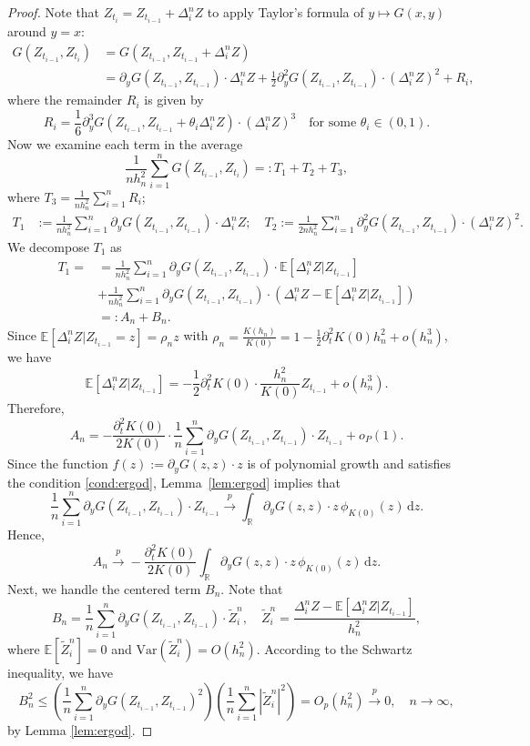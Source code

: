\documentclass[a4paper,10pt,twoside]{article}
\numberwithin{equation}{section}
\def\l{\left}
\def\r{\right}
\def\p{\partial}
\def\toP{\stackrel{p}{\longrightarrow}}
\def\E{\mathbb{E}}
\def\wt#1{\widetilde{#1}}
\def\Var{\mathrm{Var}}
\def\df{\mathrm{d}}
\begin{document}
\begin{proof}
Note that  $Z_{t_i} = Z_{t_{i-1}} + \Delta_i^n Z$
to apply Taylor's formula of $y \mapsto G(x,y)$ around $y = x$: 
\begin{align*}
G(Z_{t_{i-1}}, Z_{t_i}) 
&= G(Z_{t_{i-1}}, Z_{t_{i-1}} + \Delta_i^n Z) \\
&= \p_y G(Z_{t_{i-1}}, Z_{t_{i-1}}) \cdot \Delta_i^n Z 
+ \frac{1}{2} \p_y^2 G(Z_{t_{i-1}}, Z_{t_{i-1}}) \cdot (\Delta_i^n Z)^2 
+ R_i,
\end{align*}
where the remainder $R_i$ is given by
\[
R_i = \frac{1}{6} \p_y^3 G(Z_{t_{i-1}}, Z_{t_{i-1}} + \theta_i \Delta_i^n Z) \cdot (\Delta_i^n Z)^3
\quad \text{for some } \theta_i \in (0,1).
\]
Now we examine each term in the average
\[
\frac{1}{n h_n^2} \sum_{i=1}^n G(Z_{t_{i-1}}, Z_{t_i}) =: T_1 + T_2 + T_3,
\]
where $T_3 = \frac{1}{n h_n^2} \sum_{i=1}^n R_i$; 
\begin{align*}
T_1 &:= \frac{1}{n h_n^2} \sum_{i=1}^n \p_y G(Z_{t_{i-1}}, Z_{t_{i-1}}) \cdot \Delta_i^n Z; \quad 
T_2 := \frac{1}{2n h_n^2} \sum_{i=1}^n \p_y^2 G(Z_{t_{i-1}}, Z_{t_{i-1}}) \cdot (\Delta_i^n Z)^2. 
\end{align*}
We decompose $T_1$ as
\begin{align*}
T_1 = &= \frac{1}{n h_n^2} \sum_{i=1}^n \p_y G(Z_{t_{i-1}}, Z_{t_{i-1}}) \cdot \E[\Delta_i^n Z | Z_{t_{i-1}}] \\
&+ \frac{1}{n h_n^2} \sum_{i=1}^n \p_y G(Z_{t_{i-1}}, Z_{t_{i-1}}) \cdot \l( \Delta_i^n Z - \E[\Delta_i^n Z|Z_{t_{i-1}}] \r)\\
&=:A_n + B_n. 
\end{align*}
Since $\E[\Delta_i^n Z | Z_{t_{i-1}} = z] = \rho_n z$ with $\rho_n = \frac{K(h_n)}{K(0)} = 1 - \frac{1}{2} \p_t^2 K(0) h_n^2 + o(h_n^3)$, 
we have
\[
\E[\Delta_i^n Z|Z_{t_{i-1}}] = -\frac{1}{2} \p_t^2 K(0) \cdot \frac{h_n^2}{K(0)} Z_{t_{i-1}} + o(h_n^3).
\]
Therefore,
\[
A_n = -\frac{\p_t^2 K(0)}{2 K(0)} \cdot \frac{1}{n} \sum_{i=1}^n \p_y G(Z_{t_{i-1}}, Z_{t_{i-1}}) \cdot Z_{t_{i-1}} + o_P(1).
\]
Since the function $f(z) := \p_y G(z,z) \cdot z$ is of polynomial growth and satisfies the condition \eqref{cond:ergod}, Lemma~\ref{lem:ergod} implies that
\[
\frac{1}{n} \sum_{i=1}^n \p_y G(Z_{t_{i-1}}, Z_{t_{i-1}}) \cdot Z_{t_{i-1}} \toP \int_{\mathbb{R}} \p_y G(z,z) \cdot z \, \phi_{K(0)}(z) \,\df z.
\]
Hence,
\[
A_n \toP -\frac{\p_t^2 K(0)}{2 K(0)} \int_{\mathbb{R}} \p_y G(z,z) \cdot z \, \phi_{K(0)}(z) \,\df z.
\]
Next, we handle the centered term $B_n$. Note that 
\[
B_n= \frac{1}{n} \sum_{i=1}^n \p_y G(Z_{t_{i-1}}, Z_{t_{i-1}}) \cdot \wt{Z}_i^n, \quad \wt{Z}_i^n = \frac{\Delta_i^n Z - \E[\Delta_i^n Z| Z_{t_{i-1}}]}{h_n^2}, 
\]
where $\E[\wt{Z}_i^n] = 0$ and $\Var(\wt{Z}_i^n) =O(h_n^2)$. According to the Schwartz inequality, we have 
\[
B_n^2 \le \l(\frac{1}{n}\sum_{i=1}^n \p_y G(Z_{t_{i-1}}, Z_{t_{i-1}})^2 \r) \l(\frac{1}{n}\sum_{i=1}^n | \wt{Z}_i^n |^2  \r) = O_p(h_n^2)\toP0,\quad n\to \infty, 
\] 
by Lemma \ref{lem:ergod}. 




\end{proof}
\end{document}
